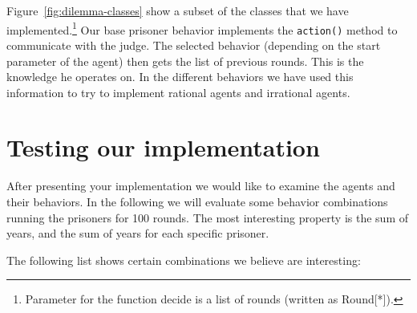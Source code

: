 \documentclass{acm_proc_article-sp}
\begin{document}
Figure~\ref{fig:dilemma-classes} show a subset of the classes that we have implemented.\footnote{Parameter for the function decide is a list of rounds (written as Round[*]).}
Our base prisoner behavior implements the \lstinline!action()! method to communicate with
the judge. The selected behavior (depending on the start parameter of the agent) then
gets the list of previous rounds. This is the knowledge he operates on. In the
different behaviors we have used this information to try to implement rational agents and
irrational agents.

\section{Testing our implementation}

After presenting your implementation we would like to examine the agents and their behaviors.
In the following we will evaluate some behavior combinations running the prisoners for 100 rounds.
The most interesting property is the sum of years, and the sum of years for each specific prisoner.

The following list shows certain combinations we believe are interesting:
\end{document}
